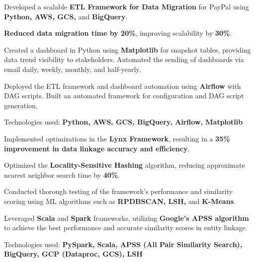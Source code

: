 \documentclass[letterpaper,10pt]{article}
\begin{document}

    \begin{resume_list}
        \vspace{5pt}
        \item Developed a scalable \textbf{ETL Framework for Data Migration} for PayPal using \textbf{Python, AWS, GCS,} and \textbf{BigQuery}.
        \item \textbf{Reduced data migration time by 20\%}, improving scalability by \textbf{30\%}.
        \item Created a dashboard in Python using \textbf{Matplotlib} for snapshot tables, providing data trend visibility to stakeholders. Automated the sending of dashboards via email daily, weekly, monthly, and half-yearly.
        \item Deployed the ETL framework and dashboard automation using \textbf{Airflow} with DAG scripts. Built an automated framework for configuration and DAG script generation.
        \item Technologies used: \textbf{Python, AWS, GCS, BigQuery, Airflow, Matplotlib}
    \end{resume_list}

    \begin{resume_list}
        \vspace{5pt}
        \item Implemented optimizations in the \textbf{Lynx Framework}, resulting in a \textbf{35\% improvement in data linkage accuracy and efficiency}.
        \item Optimized the \textbf{Locality-Sensitive Hashing} algorithm, reducing approximate nearest neighbor search time by \textbf{40\%}.
        \item Conducted thorough testing of the framework’s performance and similarity scoring using ML algorithms such as \textbf{RPDBSCAN, LSH,} and \textbf{K-Means}.
        \item Leveraged \textbf{Scala} and \textbf{Spark} frameworks, utilizing \textbf{Google's APSS algorithm} to achieve the best performance and accurate similarity scores in entity linkage.
        \item Technologies used: \textbf{PySpark, Scala, APSS (All Pair Similarity Search), BigQuery, GCP (Dataproc, GCS), LSH}
    \end{resume_list}
\end{document}
